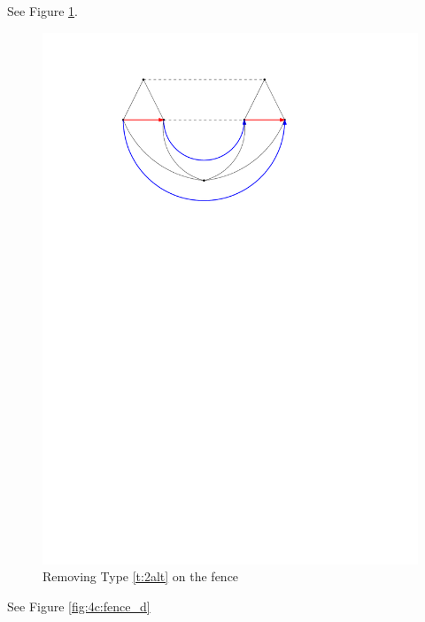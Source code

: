 
  See Figure \ref{fig:4c:fence_c}.

  \begin{figure}[h]
    \centering
    \includegraphics[scale=1]{4cycles/img/fence_c}
    \caption{Removing Type \ref{t:2alt} on the fence}
    \label{fig:4c:fence_c}
  \end{figure}

  See Figure \ref{fig:4c:fence_d}


